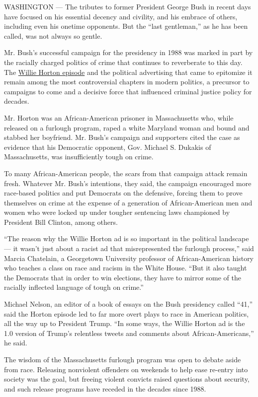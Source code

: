 WASHINGTON --- The tributes to former President George Bush in recent
days have focused on his essential decency and civility, and his embrace
of others, including even his onetime opponents. But the ``last
gentleman,'' as he has been called, was not always so gentle.

Mr. Bush's successful campaign for the presidency in 1988 was marked in
part by the racially charged politics of crime that continues to
reverberate to this day. The
\href{https://www.nytimes.com/1988/11/04/opinion/george-bush-and-willie-horton.html}{Willie
Horton episode} and the political advertising that came to epitomize it
remain among the most controversial chapters in modern politics, a
precursor to campaigns to come and a decisive force that influenced
criminal justice policy for decades.

Mr. Horton was an African-American prisoner in Massachusetts who, while
released on a furlough program, raped a white Maryland woman and bound
and stabbed her boyfriend. Mr. Bush's campaign and supporters cited the
case as evidence that his Democratic opponent, Gov. Michael S. Dukakis
of Massachusetts, was insufficiently tough on crime.

To many African-American people, the scars from that campaign attack
remain fresh. Whatever Mr. Bush's intentions, they said, the campaign
encouraged more race-based politics and put Democrats on the defensive,
forcing them to prove themselves on crime at the expense of a generation
of African-American men and women who were locked up under tougher
sentencing laws championed by President Bill Clinton, among others.

``The reason why the Willie Horton ad is so important in the political
landscape --- it wasn't just about a racist ad that misrepresented the
furlough process,'' said Marcia Chatelain, a Georgetown University
professor of African-American history who teaches a class on race and
racism in the White House. ``But it also taught the Democrats that in
order to win elections, they have to mirror some of the racially
inflected language of tough on crime.''

Michael Nelson, an editor of a book of essays on the Bush presidency
called ``41,'' said the Horton episode led to far more overt plays to
race in American politics, all the way up to President Trump. ``In some
ways, the Willie Horton ad is the 1.0 version of Trump's relentless
tweets and comments about African-Americans,'' he said.

The wisdom of the Massachusetts furlough program was open to debate
aside from race. Releasing nonviolent offenders on weekends to help ease
re-entry into society was the goal, but freeing violent convicts raised
questions about security, and such release programs have receded in the
decades since 1988.

